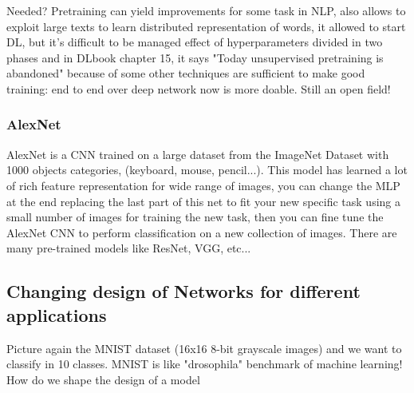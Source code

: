 \documentclass[12pt]{book}
\begin{document}
Needed? \newline
Pretraining can yield improvements for some task in NLP, also allows to exploit large texts to learn distributed representation of words, it allowed to start DL, but it's difficult to be managed effect of hyperparameters divided in two phases and in DLbook chapter 15, it says "Today unsupervised pretraining is abandoned" because of some other techniques are sufficient to make good training: end to end over deep network now is more doable. Still an open field!

\subsubsection{AlexNet}
AlexNet is a CNN trained on a large dataset from the ImageNet Dataset with 1000 objects categories, (keyboard, mouse, pencil...). This model has learned a lot of rich feature representation for wide range of images, you can change the MLP at the end replacing the last part of this net to fit your new specific task using a small number of images for training the new task, then you can fine tune the AlexNet CNN to perform classification on a new collection of images. There are many pre-trained models like ResNet, VGG, etc... 

\subsection{Changing design of Networks for different applications}
Picture again the MNIST dataset (16x16 8-bit grayscale images) and we want to classify in 10 classes. MNIST is like "drosophila" benchmark of machine learning!\newline
How do we shape the design of a model
\end{document}
